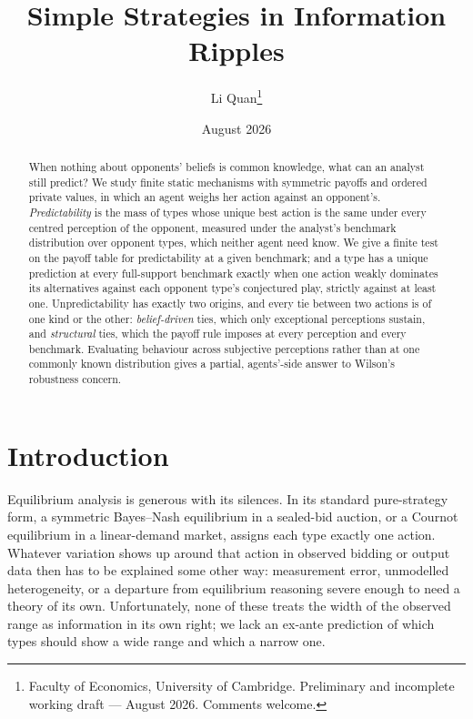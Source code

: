 \documentclass[12pt]{article}
\title{Simple Strategies in Information Ripples}
\author{Li Quan\thanks{Faculty of Economics, University of Cambridge. Preliminary and incomplete working draft --- August 2026. Comments welcome. 
}}
\date{August 2026}
\theoremstyle{definition}
\begin{document}
\maketitle

\begin{abstract}
\noindent When nothing about opponents' beliefs is common knowledge, what can an analyst still predict? We study finite static mechanisms with symmetric payoffs and ordered private values, in which an agent weighs her action against an opponent's. \emph{Predictability} is the mass of types whose unique best action is the same under every centred perception of the opponent, measured under the analyst's benchmark distribution over opponent types, which neither agent need know. We give a finite test on the payoff table for predictability at a given benchmark; and a type has a unique prediction at every full-support benchmark exactly when one action weakly dominates its alternatives against each opponent type's conjectured play, strictly against at least one. Unpredictability has exactly two origins, and every tie between two actions is of one kind or the other: \emph{belief-driven} ties, which only exceptional perceptions sustain, and \emph{structural} ties, which the payoff rule imposes at every perception and every benchmark. Evaluating behaviour across subjective perceptions rather than at one commonly known distribution gives a partial, agents'-side answer to Wilson's robustness concern.
\end{abstract}

\section{Introduction}\label{sec:intro}

Equilibrium analysis is generous with its silences. In its standard pure-strategy form, a symmetric Bayes--Nash equilibrium in a sealed-bid auction, or a Cournot equilibrium in a linear-demand market, assigns each type exactly one action. Whatever variation shows up around that action in observed bidding or output data then has to be explained some other way: measurement error, unmodelled heterogeneity, or a departure from equilibrium reasoning severe enough to need a theory of its own. Unfortunately, none of these treats the width of the observed range as information in its own right; we lack an ex-ante prediction of which types should show a wide range and which a narrow one.
\end{document}
